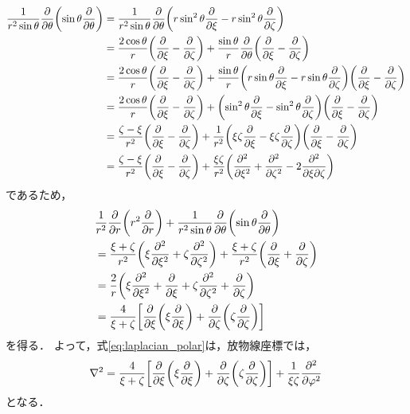 \documentclass[a4paper,11pt]{ltjsarticle}
\begin{document}
\begin{align*}
  \frac{1}{r^2 \sin \theta}\pdv{\theta}\qty(\sin \theta \pdv{\theta}) 
  &= \frac{1}{r^2 \sin \theta}\pdv{\theta} \qty(r \sin^2 \theta \pdv{\xi} - r  \sin^2 \theta \pdv{\zeta}) \\
  &= \frac{2\cos\theta}{r}\qty(\pdv{\xi} - \pdv{\zeta}) + \frac{\sin\theta}{r} \pdv{\theta}\qty( \pdv{\xi} - \pdv{\zeta}) \\
  &= \frac{2\cos\theta}{r}\qty(\pdv{\xi} - \pdv{\zeta}) + \frac{\sin\theta}{r}  \qty(r \sin \theta \pdv{\xi} - r  \sin \theta \pdv{\zeta} )\qty( \pdv{\xi} - \pdv{\zeta}) \\
  &= \frac{2\cos\theta}{r}\qty(\pdv{\xi} - \pdv{\zeta}) +  \qty(\sin^2 \theta \pdv{\xi} - \sin^2 \theta \pdv{\zeta} )\qty( \pdv{\xi} - \pdv{\zeta}) \\
  &= \frac{\zeta - \xi}{r^2}\qty(\pdv{\xi} - \pdv{\zeta}) +  \frac{1}{r^2}\qty( \xi\zeta \pdv{\xi} - \xi\zeta \pdv{\zeta} )\qty( \pdv{\xi} - \pdv{\zeta}) \\
  &= \frac{\zeta - \xi}{r^2}\qty(\pdv{\xi} - \pdv{\zeta}) +  \frac{\xi\zeta}{r^2}\qty(\pdv[2]{\xi} + \pdv[2]{\zeta} - 2 \pdv{}{\xi}{\zeta}) \\
\end{align*}
であるため，
\begin{align*}
  &\frac{1}{r^2}\pdv{r}\qty(r^2\pdv{r}) +  \frac{1}{r^2 \sin \theta}\pdv{\theta}\qty(\sin \theta \pdv{\theta}) \\
  &= \frac{\xi + \zeta}{r^2} \qty(\xi\pdv[2]{\xi} + \zeta\pdv[2]{\zeta}) + \frac{\xi + \zeta}{r^2}\qty(\pdv{\xi} + \pdv{\zeta}) \\
  &= \frac{2}{r}\qty(\xi \pdv[2]{\xi} + \pdv{\xi} + \zeta\pdv[2]{\zeta} + \pdv{\zeta}) \\
  &= \frac{4}{\xi + \zeta} \qty[\pdv{\xi}\qty(\xi\pdv{\xi}) + \pdv{\zeta}\qty(\zeta\pdv{\zeta})]
\end{align*}
を得る．
よって，式\ref{eq:laplacian_polar}は，放物線座標では，
\begin{align}\label{eq:laplacian_parabolic}
  \nabla^2 = \frac{4}{\xi + \zeta} \qty[\pdv{\xi}\qty(\xi\pdv{\xi}) + \pdv{\zeta}\qty(\zeta\pdv{\zeta})] + \frac{1}{\xi\zeta} \pdv[2]{\varphi}
\end{align}
となる．
\end{document}
